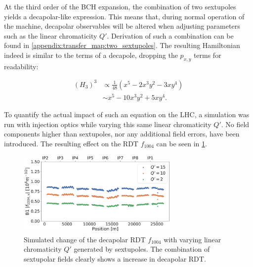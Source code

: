 \FloatBarrier
\subsubsection{}

At the third order of the BCH expansion, the combination of two sextupoles yields a decapolar-like
expression. This means that, during normal operation of the machine, decapolar observables will be
altered when adjusting parameters such as the linear chromaticity $Q'$. 
Derivation of such a combination can be found in \cref{appendix:transfer_map:two_sextupoles}. The
resulting Hamiltonian indeed is similar to the terms of a decapole, dropping the $p_{x,y}$ terms for
readability:

\begin{equation}
    \begin{aligned}
         (H_3)^3 &\propto \frac{1}{48} \left(x^5 - 2x^3y^2 - 3xy^4 \right)\\
                 &\sim    x^5 - 10x^3y^2 + 5xy^4.
    \end{aligned}
    \label{eq:decapoles:sextupoles_b5}
\end{equation}

To quantify the actual impact of such an equation on the LHC, a simulation was run with injection
optics while varying this same linear chromaticity $Q'$. No field components higher than
sextupoles, nor any additional field errors, have been introduced. The resulting effect on the RDT
$f_{1004}$ can be seen in \cref{fig:decapoles:rdts:simulated_f1004_from_sextupoles}.


\begin{figure}[H]
    \centering
    \includegraphics[width=0.7\textwidth]{./images/f1004/f1004_dq.pdf}
    \caption{Simulated change of the decapolar RDT $f_{1004}$ with varying linear
    chromaticity $Q'$ generated by sextupoles. The combination of sextupolar fields clearly shows a 
    increase in decapolar RDT.}
    \label{fig:decapoles:rdts:simulated_f1004_from_sextupoles}
\end{figure}

